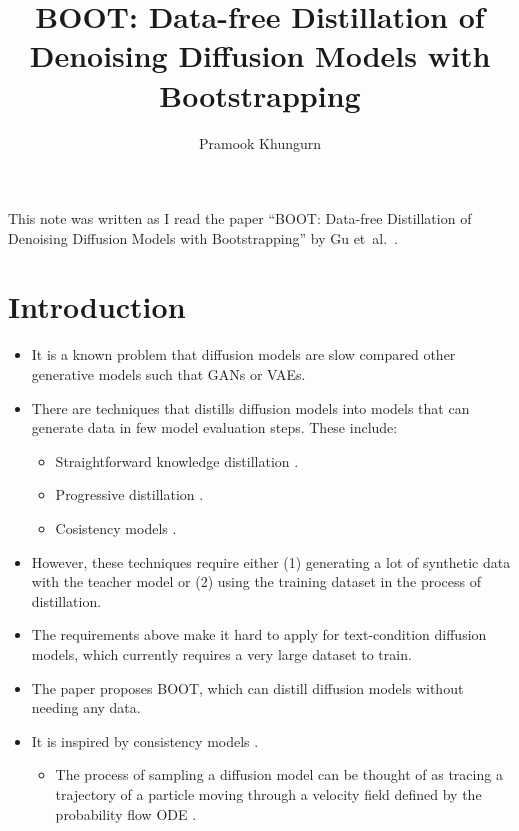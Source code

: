 \documentclass[10pt]{article}
\title{BOOT: Data-free Distillation of Denoising Diffusion Models with Bootstrapping}
\author{Pramook Khungurn}
\newcommand{\etal}{{et~al.}}
\begin{document}
\maketitle

This note was written as I read the paper ``BOOT: Data-free Distillation of Denoising Diffusion Models with Bootstrapping'' by Gu \etal~\cite{Gu:2023}.

\section{Introduction}

\begin{itemize}
  \item It is a known problem that diffusion models are slow compared other generative models such that GANs or VAEs.
  
  \item There are techniques that distills diffusion models into models that can generate data in few model evaluation steps. These include:
  \begin{itemize}
    \item Straightforward knowledge distillation \cite{Luhman:2021}.
    \item Progressive distillation \cite{Salimans:2022, Meng:2023}.
    \item Cosistency models \cite{Song:2023}.
  \end{itemize}

  \item However, these techniques require either (1) generating a lot of synthetic data with the teacher model or (2) using the training dataset in the process of distillation. 
  
  \item The requirements above make it hard to apply for text-condition diffusion models, which currently requires a very large dataset to train.
  
  \item The paper proposes BOOT, which can distill diffusion models without needing any data. 
  
  \item It is inspired by consistency models \cite{Song:2023}.
  \begin{itemize}
    \item The process of sampling a diffusion model can be thought of as tracing a trajectory of a particle moving through a velocity field defined by the probability flow ODE \cite{Song:2021}.
    

\end{itemize}
\end{itemize}
\end{document}
